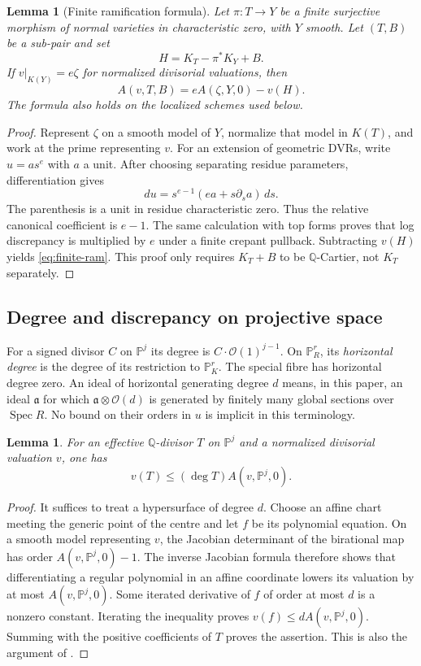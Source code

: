 \documentclass[11pt,reqno]{amsart}
\numberwithin{equation}{section}
\newtheorem{lemma}[theorem]{Lemma}
\theoremstyle{definition}
\theoremstyle{remark}
\newcommand{\Q}{\mathbb Q}
\newcommand{\PP}{\mathbb P}
\newcommand{\OO}{\mathcal O}
\newcommand{\Spec}{\operatorname{Spec}}
\newcommand{\ba}{\mathfrak a}
\begin{document}
\begin{lemma}[Finite ramification formula]\label{lem:ramification}
Let $\pi:T\to Y$ be a finite surjective morphism of normal varieties in characteristic zero, with $Y$ smooth. Let $(T,B)$ be a sub-pair and set
\[
 H=K_T-\pi^*K_Y+B.
\]
If $v|_{K(Y)}=e\zeta$ for normalized divisorial valuations, then
\begin{equation}\label{eq:finite-ram}
 A(v,T,B)=eA(\zeta,Y,0)-v(H).
\end{equation}
The formula also holds on the localized schemes used below.
\end{lemma}
\begin{proof}
Represent $\zeta$ on a smooth model of $Y$, normalize that model in $K(T)$, and work at the prime representing $v$. For an extension of geometric DVRs, write $u=a s^e$ with $a$ a unit. After choosing separating residue parameters, differentiation gives
\[
 du=s^{e-1}(ea+s\partial_s a)\,ds.
\]
The parenthesis is a unit in residue characteristic zero. Thus the relative canonical coefficient is $e-1$. The same calculation with top forms proves that log discrepancy is multiplied by $e$ under a finite crepant pullback. Subtracting $v(H)$ yields \eqref{eq:finite-ram}. This proof only requires $K_T+B$ to be $\Q$-Cartier, not $K_T$ separately.
\end{proof}

\subsection{Degree and discrepancy on projective space}
For a signed divisor $C$ on $\PP^j$ its degree is $C\cdot\OO(1)^{j-1}$. On $\PP^r_R$, its \emph{horizontal degree} is the degree of its restriction to $\PP^r_K$. The special fibre has horizontal degree zero. An ideal of horizontal generating degree $d$ means, in this paper, an ideal $\ba$ for which $\ba\otimes\OO(d)$ is generated by finitely many global sections over $\Spec R$. No bound on their orders in $u$ is implicit in this terminology.

\begin{lemma}\label{lem:degree}
For an effective $\Q$-divisor $T$ on $\PP^j$ and a normalized divisorial valuation $v$, one has
\[
 v(T)\le (\deg T)A(v,\PP^j,0).
\]
\end{lemma}
\begin{proof}
It suffices to treat a hypersurface of degree $d$. Choose an affine chart meeting the generic point of the centre and let $f$ be its polynomial equation. On a smooth model representing $v$, the Jacobian determinant of the birational map has order $A(v,\PP^j,0)-1$. The inverse Jacobian formula therefore shows that differentiating a regular polynomial in an affine coordinate lowers its valuation by at most $A(v,\PP^j,0)$. Some iterated derivative of $f$ of order at most $d$ is a nonzero constant. Iterating the inequality proves $v(f)\le dA(v,\PP^j,0)$. Summing with the positive coefficients of $T$ proves the assertion. This is also the argument of \cite[Lemma~2.12]{Jiao}.
\end{proof}
\end{document}
